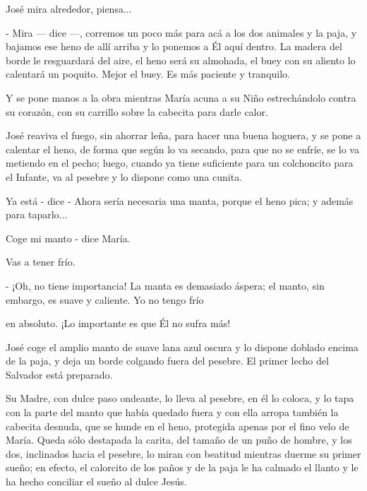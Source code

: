 \documentclass[12pt]{book} %
\begin{document}
José mira alrededor, piensa... 

- Mira — dice —, corremos un poco más para acá a los dos animales y la paja, y bajamos ese heno de allí arriba y lo ponemos a Él aquí dentro. La madera del borde le resguardará del aire, el heno será su almohada, el buey con su aliento lo calentará un poquito. Mejor el buey. Es más paciente y tranquilo. 

Y se pone manos a la obra mientras María acuna a su Niño estrechándolo contra su corazón, con su carrillo sobre la cabecita para darle calor. 

José reaviva el fuego, sin ahorrar leña, para hacer una buena hoguera, y se pone a calentar el heno, de forma que según lo va secando, para que no se enfríe, se lo va metiendo en el pecho; luego, cuando ya tiene suficiente para un colchoncito para el Infante, va al pesebre y lo dispone como una cunita. 

Ya está - dice - Ahora sería necesaria una manta, porque el heno pica; y además para taparlo... 

Coge mi manto - dice María. 

Vas a tener frío. 

- ¡Oh, no tiene importancia! La manta es demasiado áspera; el manto, sin embargo, es suave y caliente. Yo no tengo frío 

en absoluto. ¡Lo importante es que Él no sufra más! 

José coge el amplio manto de suave lana azul oscura y lo dispone doblado encima de la paja, y deja un borde colgando fuera del pesebre. El primer lecho del Salvador está preparado. 

Su Madre, con dulce paso ondeante, lo lleva al pesebre, en él lo coloca, y lo tapa con la parte del manto que había quedado fuera y con ella arropa también la cabecita desnuda, que se hunde en el heno, protegida apenas por el fino velo de María. Queda sólo destapada la carita, del tamaño de un puño de hombre, y los dos, inclinados hacia el pesebre, lo miran con beatitud mientras duerme su primer sueño; en efecto, el calorcito de los paños y de la paja le ha calmado el llanto y le ha hecho conciliar el sueño al dulce Jesús. 
\end{document}
